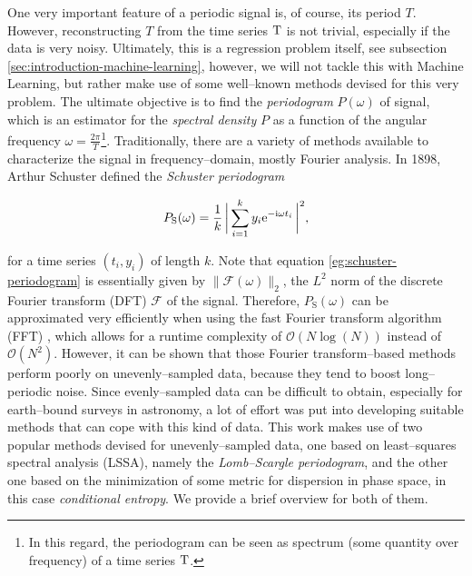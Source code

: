 One very important feature of a periodic signal is, of course, its period $T$. However, reconstructing $T$ from the time series $\mathrm{T}$ is not trivial, especially if the data is very noisy. Ultimately, this is a regression problem itself, see subsection \ref{sec:introduction-machine-learning}, however, we will not tackle this with Machine Learning, but rather make use of some well--known methods devised for this very problem. The ultimate objective is to find the \emph{periodogram} $P(\omega)$ of signal, which is an estimator for the \emph{spectral density} $P$ as a function of the angular frequency $\omega = \frac{2 \pi}{T}$\footnote{In this regard, the periodogram can be seen as spectrum (some quantity over frequency) of a time series $\mathrm{T}$.}. Traditionally, there are a variety of methods available to characterize the signal in frequency--domain, mostly Fourier analysis. In 1898, Arthur Schuster defined the \emph{Schuster periodogram}

\begin{equation}
\label{eg:schuster-periodogram}
P_{\text{S}}(\omega) = \frac{1}{k} \, \biggl| \, \sum\limits_{i=1}^{k} y_i \mathrm{e}^{-\mathrm{i} \omega t_i} \, \biggr|^2,
\end{equation}


for a time series $(t_i, y_i)$ of length $k$. Note that equation \eqref{eg:schuster-periodogram} is essentially given by $\| \mathcal{F}(\omega) \|_2 $, the $L^2$ norm of the discrete Fourier transform (DFT) $\mathcal{F}$ of the signal. Therefore, $P_{\text{S}}(\omega)$ can be approximated very efficiently when using the fast Fourier transform algorithm (FFT) \citep{cooley1965}, which allows for a runtime complexity of $\mathcal{O}(N\log{(N)})$ instead of $\mathcal{O}(N^2)$. However, it can be shown that those Fourier transform--based methods perform poorly on unevenly--sampled data, because they tend to boost long--periodic noise. Since evenly--sampled data can be difficult to obtain, especially for earth--bound surveys in astronomy, a lot of effort was put into developing suitable methods that can cope with this kind of data. This work makes use of two popular methods devised for unevenly--sampled data, one based on least--squares spectral analysis (LSSA), namely the \emph{Lomb--Scargle periodogram}, and the other one based on the minimization of some metric for dispersion in phase space, in this case \emph{conditional entropy}. We provide a brief overview for both of them.

